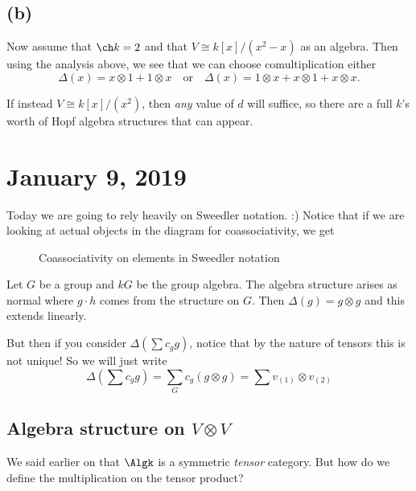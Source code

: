\documentclass[12pt]{article}
\begin{document}
\begin{sol}
	\subsection*{(b)}
	Now assume that $\ch k=2$ and that $V\cong k[x]/(x^2-x)$ as an algebra. Then using the analysis above, 
	we see that we can choose comultiplication either
	\[\Delta(x)=x\otimes 1+1\otimes x\quad\text{or}\quad \Delta(x)=1\otimes x+x\otimes 1+x\otimes x.\]

	If instead $V\cong k[x]/(x^2)$, then \textit{any} value of $d$ will suffice, so there are a full $k$'s worth
	of Hopf algebra structures that can appear.
\end{sol} 

\section{January 9, 2019}
Today we are going to rely heavily on Sweedler notation. :) Notice that if we are looking at actual objects in the 
diagram for coassociativity, we get
\begin{figure}[h]
	\centering
	\caption{Coassociativity on elements in Sweedler notation}
\end{figure}

\begin{ex}
	Let $G$ be a group and $kG$ be the group algebra. The algebra structure arises as normal
	where $g\cdot h$ comes from the structure on $G$. Then $\Delta(g)=g\otimes g$ and this extends linearly.

	But then if you consider $\Delta(\sum c_gg)$, notice that by the nature of tensors this is not unique!
	So we will just write
	\[\Delta\left(\sum c_gg\right)=\sum_Gc_g(g\otimes g)=\sum v_{(1)}\otimes v_{(2)}\]
\end{ex}

\subsection{Algebra structure on $V\otimes V$}
We said earlier on that $\Algk$ is a symmetric \textit{tensor} category. But how do we
define the multiplication on the tensor product?
\end{document}
